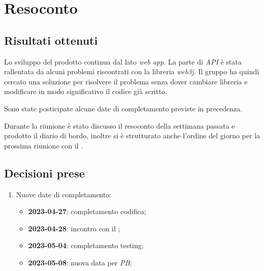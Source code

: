 \section{Resoconto}

\subsection{Risultati ottenuti}

Lo sviluppo del prodotto continua dal lato \textit{web app}. La parte di \textit{API} è stata rallentata da alcuni problemi riscontrati con la libreria \textit{web3j}. Il gruppo ha quindi cercato una soluzione per risolvere il problema senza dover cambiare libreria e modificare in modo significativo il codice già scritto.

Sono state posticipate alcune date di completamento previste in precedenza.

Durante la riunione è stato discusso il resoconto della settimana passata e prodotto il diario di bordo, inoltre si è strutturato anche l'ordine del giorno per la prossima riunione con il \Cardin{}.

\subsection{Decisioni prese}

\begin{enumerate}

    \item Nuove date di completamento:
    \begin{itemize}
        \item \textbf{2023-04-27}: completamento codifica;
        \item \textbf{2023-04-28}: incontro con il \Cardin{};
        \item \textbf{2023-05-04}: completamento testing;
        \item \textbf{2023-05-08}: nuova data per \textit{PB};
    \end{itemize}
    
\end{enumerate}
